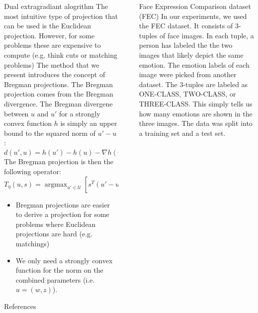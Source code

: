 \documentclass[final]{beamer}
\DeclareMathOperator*{\argmax}{\arg\max}
\newlength{\sepwidth}
\newlength{\colwidth}
\newcommand{\separatorcolumn}{\begin{column}{\sepwidth}\end{column}}
\begin{document}
\begin{frame}[t]
\begin{columns}[t]
\begin{column}{\colwidth}
\begin{block}{Dual extragradiant alogrithm}
    The most intuitive type of projection that can be used is the Euclidean projection.
    However, for some problems these are expensive to compute (e.g. think cuts or matching problems)
    The method that we present introduces the concept of Bregman projections.
    The Bregman projection comes from the Bregman divergence. The Bregman divergene between $u$ and $u'$ for a strongly convex function 
    $h$ is simply an upper bound to the squared  norm of $u' - u$ :
    \begin{equation*}
      d(u', u) = h(u') - h(u) - \nabla h(u)^T (u' - u) \geq \lVert u' - u \rVert^2
    \end{equation*}
    The Bregman projection is then the following operator:
    \begin{equation*}
      T_{\eta}(u,s) = \argmax_{u' \in \mathcal{U}} \left[ s^T (u' - u) - \frac{1}{\eta} d(u', u)\right]
      \end{equation*}
    \begin{itemize}
      \item Bregman projections are easier to derive a projection for some problems where Euclidean projections are hard (e.g. matchings)
      \item We only need a strongly convex function for the norm on the combined parameters (i.e. $u = (w,z)$).
    \end{itemize}
  \end{block}
  
  \begin{block}{References}

    \nocite{*}
    \footnotesize{}

  \end{block}

\end{column}

\separatorcolumn

\begin{column}{\colwidth}

  \begin{alertblock}{Face Expression Comparison dataset (FEC)}
    In our experiments, we used the FEC dataset. It consists of 3-tuples of face images. In each tuple, a person has labeled the 
    the two images that likely depict the same emotion. The emotion labels of each image were picked from another dataset. The 3-tuples
    are labeled as ONE-CLASS, TWO-CLASS, or THREE-CLASS. This simply tells us how many emotions are shown in the three images. The data
    was split into a training set and a test set.


\end{alertblock}
\end{column}
\end{columns}
\end{frame}
\end{document}
